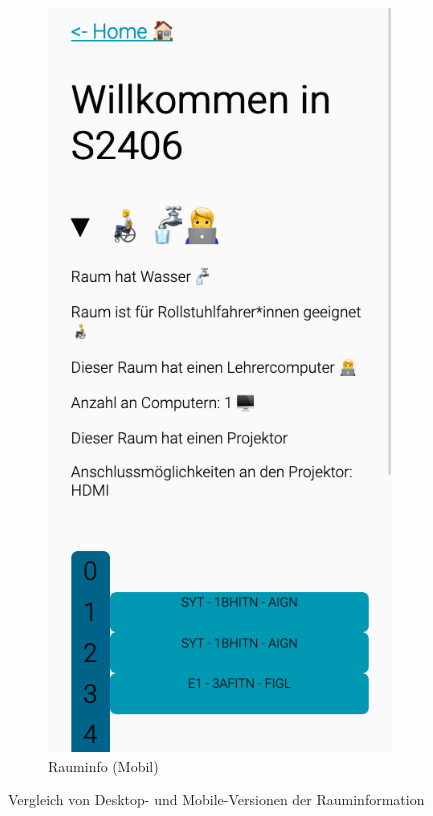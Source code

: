 \begin{figure}[H]
\begin{subfigure}[c]{0.35\textwidth}
        \includegraphics[width=\textwidth]{media/ResponsiveDesign/ZeliaMobile.png}
        \caption{Rauminfo (Mobil)}
    \end{subfigure}
    \caption{Vergleich von Desktop- und Mobile-Versionen der Rauminformation}
    \label{fig:info}
\end{figure}

